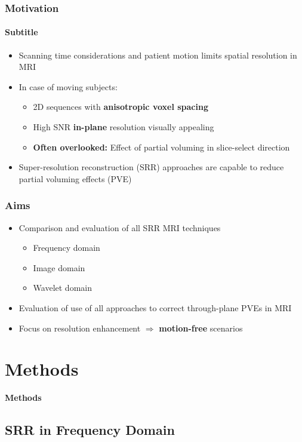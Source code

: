 \documentclass[compress,12pt]{beamer} %
\def\headline#1{\begin{frame}[c]\centering\color{headlinecolor}\LARGE\bfseries#1\end{frame}}
\begin{document}
\begin{frame}[t]\frametitle{Motivation}\framesubtitle{Subtitle}
    \begin{itemize}[<+->]\setlength{\itemsep}{12pt}
        \item Scanning time considerations and patient motion limits spatial resolution in MRI
        \item In case of moving subjects:
        \begin{itemize}
            \item 2D sequences with {\bf anisotropic voxel spacing}
            \item High SNR {\bf in-plane} resolution visually appealing
            \item \textbf{Often overlooked:} Effect of partial voluming in slice-select direction
        \end{itemize}
        \item Super-resolution reconstruction (SRR) approaches are capable to reduce partial voluming effects (PVE)
    \end{itemize}
\end{frame}

\begin{frame}[t,label=Aims]\frametitle{Aims}
    \begin{itemize}\setlength{\itemsep}{12pt}
        \item<1-> Comparison and evaluation of all SRR MRI techniques
        \begin{itemize}
            \item Frequency domain
            \item Image domain
            \item Wavelet domain
        \end{itemize}
        \item<2-> Evaluation of use of all approaches to correct through-plane PVEs in MRI
        \item<3-> Focus on resolution enhancement $\Rightarrow$ {\bf motion-free} scenarios
    \end{itemize}
\end{frame}

\section{Methods}
\headline{Methods}

\subsection[Frequency]{SRR in Frequency Domain} %
\label{sub:k_space}
\end{document}
